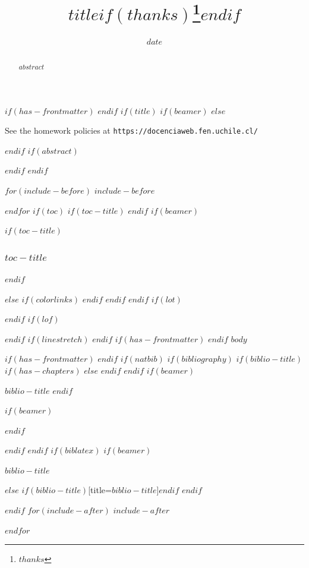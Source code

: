 \documentclass[
$if(fontsize)$
  $fontsize$,
$endif$
$if(lang)$
  $babel-lang$,
$endif$
$if(papersize)$
  $papersize$paper,
$endif$
$if(beamer)$
  ignorenonframetext,
$if(handout)$
  handout,
$endif$
$if(aspectratio)$
  aspectratio=$aspectratio$,
$endif$
$endif$
$for(classoption)$
  $classoption$$sep$,
$endfor$
]{$documentclass$}
\title{\textsc{\Large{$title$$if(thanks)$\thanks{$thanks$}$endif$}}\vspace{-2ex}}
\author{\textsc{\Large{$for(author)$$author$$sep$ \and $endfor$}}}
\date{$date$}
\institute{$for(institute)$$institute$$sep$ \and $endfor$}
\newif\ifbibliography
\begin{document}
$if(has-frontmatter)$
\frontmatter
$endif$
$if(title)$
$if(beamer)$
\frame{\titlepage}
$else$
\maketitle
\vspace{-1cm}
\begin{center}
\vspace{0.5cm}
\small{See the homework policies at \texttt{https://docenciaweb.fen.uchile.cl/}}%
\vspace{0.25cm}
\end{center}

$endif$
$if(abstract)$
\begin{abstract}
$abstract$
\end{abstract}
$endif$
$endif$

$for(include-before)$
$include-before$

$endfor$
$if(toc)$
$if(toc-title)$
\renewcommand*\contentsname{$toc-title$}
$endif$
$if(beamer)$
\begin{frame}[allowframebreaks]
$if(toc-title)$
  \frametitle{$toc-title$}
$endif$
  \tableofcontents[hideallsubsections]
\end{frame}
$else$
{
$if(colorlinks)$
\hypersetup{linkcolor=$if(toccolor)$$toccolor$$else$$endif$}
$endif$
\setcounter{tocdepth}{$toc-depth$}
\tableofcontents
}
$endif$
$endif$
$if(lot)$
\listoftables
$endif$
$if(lof)$
\listoffigures
$endif$
$if(linestretch)$
$endif$
$if(has-frontmatter)$
\mainmatter
$endif$
$body$

$if(has-frontmatter)$
\backmatter
$endif$
$if(natbib)$
$if(bibliography)$
$if(biblio-title)$
$if(has-chapters)$
\renewcommand\bibname{$biblio-title$}
$else$
\renewcommand\refname{$biblio-title$}
$endif$
$endif$
$if(beamer)$
\begin{frame}[allowframebreaks]{$biblio-title$}
  \bibliographytrue
$endif$
  
$if(beamer)$
\end{frame}
$endif$

$endif$
$endif$
$if(biblatex)$
$if(beamer)$
\begin{frame}[allowframebreaks]{$biblio-title$}
  \bibliographytrue
  \printbibliography[heading=none]
\end{frame}
$else$
\printbibliography$if(biblio-title)$[title=$biblio-title$]$endif$
$endif$

$endif$
$for(include-after)$
$include-after$

$endfor$
\end{document}
